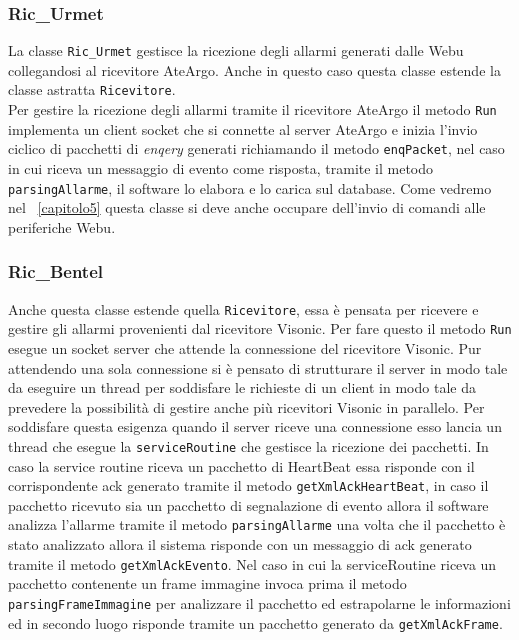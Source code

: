 \subsubsection{Ric\_Urmet}
La classe \texttt{Ric\_Urmet} gestisce la ricezione degli allarmi generati dalle Webu collegandosi al ricevitore AteArgo.
Anche in questo caso questa classe estende la classe astratta \texttt{Ricevitore}.\\
Per gestire la ricezione degli allarmi tramite il ricevitore AteArgo il metodo \texttt{Run} implementa un client socket che si connette al server AteArgo e inizia l'invio ciclico di pacchetti di \emph{enqery} generati richiamando il metodo \texttt{enqPacket}, nel caso in cui riceva un messaggio di evento come risposta, tramite il metodo \texttt{parsingAllarme}, il software lo elabora e lo carica sul database. Come vedremo nel \chaptername~\ref{capitolo5} questa classe si deve anche occupare dell'invio di comandi alle periferiche Webu.\\
\subsubsection{Ric\_Bentel}
Anche questa classe estende quella \texttt{Ricevitore}, essa è pensata per ricevere e gestire gli allarmi provenienti dal ricevitore Visonic. Per fare questo il metodo \texttt{Run} esegue un socket server che attende la connessione del ricevitore Visonic. Pur attendendo una sola connessione si è pensato di strutturare il server in modo tale da eseguire un thread per soddisfare le richieste di un client in modo tale da prevedere la possibilità di gestire anche più ricevitori Visonic in parallelo. Per soddisfare questa esigenza quando il server riceve una connessione esso lancia un thread che esegue la \texttt{serviceRoutine} che gestisce la ricezione dei pacchetti. In caso la service routine riceva un pacchetto di HeartBeat essa risponde con il corrispondente ack generato tramite il metodo \texttt{getXmlAckHeartBeat}, in caso il pacchetto ricevuto sia un pacchetto di segnalazione di evento allora il software analizza l'allarme tramite il metodo \texttt{parsingAllarme} una volta che il pacchetto è stato analizzato allora il sistema risponde con un messaggio di ack generato tramite il metodo \texttt{getXmlAckEvento}. Nel caso in cui la serviceRoutine riceva un pacchetto contenente un frame immagine invoca prima il metodo \texttt{parsingFrameImmagine} per analizzare il pacchetto ed estrapolarne le informazioni ed in secondo luogo risponde tramite un pacchetto generato da \texttt{getXmlAckFrame}.

